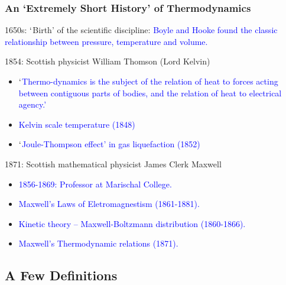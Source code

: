\documentclass[10pt,compress]{beamer}
\begin{document}
\begin{frame}
 \frametitle{An `Extremely Short History' of Thermodynamics}

   \begin{block}{1650s: $\lq$Birth' of the scientific discipline:}
   \textcolor{blue}{Boyle and Hooke found the classic relationship between pressure, temperature and volume.}
   \end{block}


   \begin{block}{1854: Scottish physicist William Thomson (Lord Kelvin)}
     \begin{itemize}
       \item \textcolor{blue}{$\lq$Thermo-dynamics is the subject of the relation of heat to forces acting between contiguous parts of bodies, and the relation of heat to electrical agency.'}
       \item \textcolor{blue}{Kelvin scale temperature (1848)}
       \item \textcolor{blue}{$\lq$Joule-Thompson effect' in gas liquefaction (1852)}
     \end{itemize}
   \end{block}

   \begin{block}{1871: Scottish mathematical physicist James Clerk Maxwell}
     \begin{itemize}
       \item \textcolor{blue}{1856-1869: Professor at Marischal College.}
       \item \textcolor{blue}{Maxwell's Laws of Eletromagnestism (1861-1881).}
       \item \textcolor{blue}{Kinetic theory -- Maxwell-Boltzmann distribution (1860-1866).}
       \item \textcolor{blue}{Maxwell's Thermodynamic relations (1871).}
     \end{itemize}
   \end{block}

\end{frame}

\subsection{A Few Definitions} 
\end{document}

